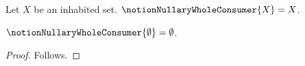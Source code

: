 

\begin{definition}\label{notion_nullary_whole_consumer}
    Let $X$ be an inhabited set.
    $\notionNullaryWholeConsumer{X}=X$.
\end{definition}

\begin{proposition}\label{notion_nullary_whole_missing}
    $\notionNullaryWholeConsumer{\emptyset}=\emptyset$.
\end{proposition}
\begin{proof}
    Follows.
\end{proof}
